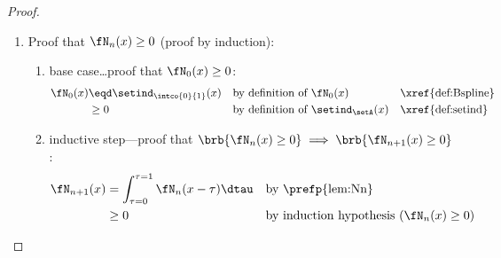 \begin{proof}
\begin{enumerate}
  \item Proof that $\fN_n(x) \ge 0$ (proof by induction): \label{item:bspline_Nprop_ge0}
    \begin{enumerate}
      \item base case\ldots proof that $\fN_0(x)\ge0$:
        \begin{align*}
          \fN_0(x)
            &\eqd \setind_\intco{0}{1}(x)
            &&    \text{by definition of $\fN_0(x)$}         &&\text{\xref{def:Bspline}}
          \\&\ge  0
            &&    \text{by definition of $\setind_\setA(x)$} &&\text{\xref{def:setind}}
        \end{align*}

      \item inductive step---proof that $\brb{\fN_n(x)\ge0}\implies\brb{\fN_{n+1}(x)\ge0}$:
        \begin{align*}
          \fN_{n+1}(x)
            &= \int_{\tau=0}^{\tau=1} \fN_n(x-\tau) \dtau
            && \text{by \prefp{lem:Nn}}
          \\&\ge 0
            && \text{by induction hypothesis ($\fN_n(x)\ge0$)}
        \end{align*}
    \end{enumerate}


\end{enumerate}
\end{proof}
